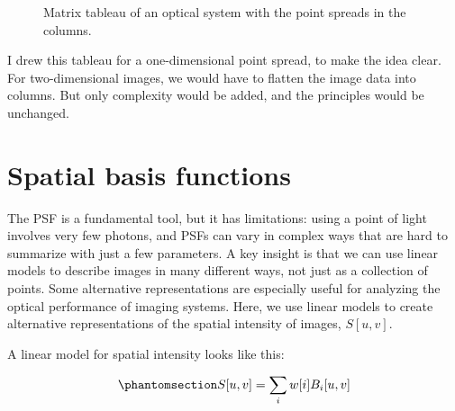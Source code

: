 \documentclass[
  letterpaper,
]{book}
\begin{document}
\begin{figure}


\caption{\label{fig-ls-matrix-psf}Matrix tableau of an optical system
with the point spreads in the columns.}

\end{figure}%

I drew this tableau for a one-dimensional point spread, to make the idea
clear. For two-dimensional images, we would have to flatten the image
data into columns. But only complexity would be added, and the
principles would be unchanged.

\section{Spatial basis functions}\label{sec-ls-spatial-basis}

The PSF is a fundamental tool, but it has limitations: using a point of
light involves very few photons, and PSFs can vary in complex ways that
are hard to summarize with just a few parameters. A key insight is that
we can use linear models to describe images in many different ways, not
just as a collection of points. Some alternative representations are
especially useful for analyzing the optical performance of imaging
systems. Here, we use linear models to create alternative
representations of the spatial intensity of images, \(S[u,v]\).

A linear model for spatial intensity looks like this:

\begin{equation}\phantomsection\label{eq-spatial-linear-model}{
S[u,v] = \sum_{i} w[i] B_i[u,v]
}\end{equation}
\end{document}
